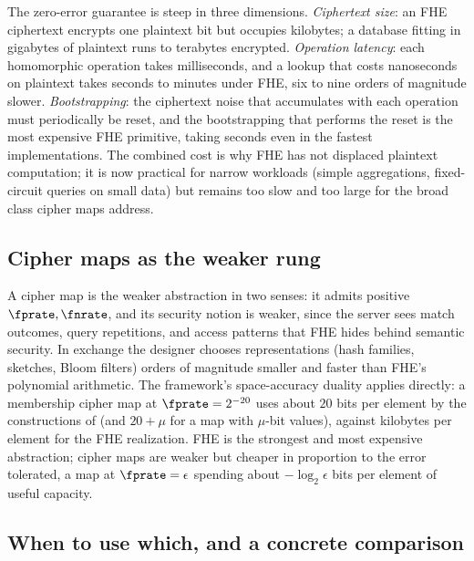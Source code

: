The zero-error guarantee is steep in three dimensions. \emph{Ciphertext
size}: an FHE ciphertext encrypts one plaintext bit but occupies
kilobytes; a database fitting in gigabytes of plaintext runs to terabytes
encrypted. \emph{Operation latency}: each homomorphic operation takes
milliseconds, and a lookup that costs nanoseconds on plaintext takes
seconds to minutes under FHE, six to nine orders of magnitude slower.
\emph{Bootstrapping}: the ciphertext noise that accumulates with each
operation must periodically be reset, and the bootstrapping that performs
the reset is the most expensive FHE primitive, taking seconds even in the
fastest implementations. The combined cost is why FHE has not displaced
plaintext computation; it is now practical for narrow workloads (simple
aggregations, fixed-circuit queries on small data) but remains too slow
and too large for the broad class cipher maps address.

\subsection*{Cipher maps as the weaker rung}

A cipher map is the weaker abstraction in two senses: it admits positive
$\fprate, \fnrate$, and its security notion is weaker, since the server
sees match outcomes, query repetitions, and access patterns that FHE
hides behind semantic security. In exchange the designer chooses representations
(hash families, sketches, Bloom filters) orders of magnitude smaller and
faster than FHE's polynomial arithmetic. The framework's space-accuracy
duality applies directly: a membership cipher map at $\fprate = 2^{-20}$
uses about $20$ bits per element by the constructions of
 (and $20 + \mu$ for a map with
$\mu$-bit values), against kilobytes per element for the FHE
realization. FHE is the strongest and most expensive abstraction;
cipher maps are weaker but cheaper in proportion to the error tolerated,
a map at $\fprate = \epsilon$ spending about $-\log_2 \epsilon$ bits per
element of useful capacity.

\subsection*{When to use which, and a concrete comparison}

